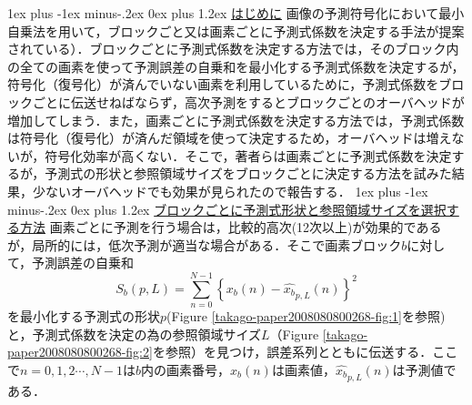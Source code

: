 \documentclass[9pt,dvipdfmx,uplatex]{jsarticle}
\makeatletter
\def\section{\@startsection {section}{1}{\z@}
{1ex plus -1ex minus-.2ex}%
{0ex plus 1.2ex}%
 {\normalsize\bf}%
 }
\makeatother
\begin{document}
\section{\underline{はじめに}}
画像の予測符号化において最小自乗法を用いて，ブロックごと又は画素ごとに予測式係数を決定する手法が提案されている）\cite{sdkguide}．ブロックごとに予測式係数を決定する方法では，そのブロック内の全ての画素を使って予測誤差の自乗和を最小化する予測式係数を決定するが，符号化（復号化）が済んでいない画素を利用しているために，予測式係数をブロックごとに伝送せねばならず，高次予測をするとブロックごとのオーバヘッドが増加してしまう．また，画素ごとに予測式係数を決定する方法では，予測式係数は符号化（復号化）が済んだ領域を使って決定するため，オーバヘッドは増えないが，符号化効率が高くない．そこで，著者らは画素ごとに予測式係数を決定するが，予測式の形状と参照領域サイズをブロックごとに決定する方法を試みた結果，少ないオーバヘッドでも効果が見られたので報告する．
\section{\underline{ブロックごとに予測式形状と参照領域サイズを選択する方法}}
画素ごとに予測を行う場合は，比較的高次(12次以上)が効果的であるが，局所的には，低次予測が適当な場合がある．そこで画素ブロック$b$に対して，予測誤差の自乗和
$$
S_b(p,L)=\sum_{n=0}^{N-1} \left\{ x_b(n)-\hat{x_b}_{p,L}(n) \right\}^2
$$
を最小化する予測式の形状$p$(Figure \ref{takago-paper2008080800268-fig:1}を参照)と，予測式係数を決定の為の参照領域サイズ$L$（Figure \ref{takago-paper2008080800268-fig:2}を参照）を見つけ，誤差系列とともに伝送する．ここで$n=0,1,2\cdots,N-1$は$b$内の画素番号，$x_b(n)$は画素値，$\hat{x_b}_{p,L}(n)$は予測値である．
\end{document}
